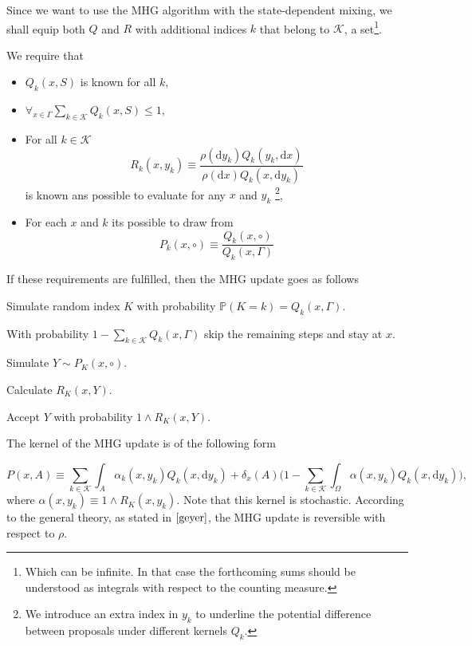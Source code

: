 Since we want to use the MHG algorithm with the state-dependent mixing, we shall equip both $Q$ and $R$ with additional indices $k$ that belong to $\mathcal{K}$, a set\footnote{Which can be infinite. In that case the forthcoming sums should be understood as integrals with respect to the counting measure.}.  

We require that

\begin{itemize}
	\item $Q_k (x,S)$ is known for all $k$,
	\item $\forall_{x \in \Gamma} \underset{ k \in \mathcal{K}}{\sum} Q_k (x,S) \leq 1$,
	\item For all $k \in \mathcal{K}$ $$R_k (x,y_k) \equiv \frac{\rho(\mathrm{d } y_k)Q_k (y_k, \mathrm{d }x)}{\rho(\mathrm{d } x)Q_k (x, \mathrm{d }y_k)}$$ is known ans possible to evaluate for any $x$ and $y_k$ \footnote{We introduce an extra index in $y_k$ to underline the potential difference between proposals under different kernels $Q_k$.},
	\item For each $x$ and $k$ its possible to draw from $$P_k(x, \circ) \equiv \frac{Q_k (x, \circ)}{Q_k (x, \Gamma)}$$
\end{itemize}

If these requirements are fulfilled, then the MHG update goes as follows

\begin{algorithm}
	\item Simulate random index $K$ with probability $\mathbb{P}( K = k ) = Q_k (x,\Gamma)$.
	\item[] With probability $1-\underset{k \in \mathcal{K}}{\sum} Q_k (x,\Gamma)$ skip the remaining steps and stay at $x$.
	\item Simulate $Y \sim P_K (x, \circ)$.
	\item Calculate $R_K (x,Y)$.
	\item Accept $Y$ with probability $1\wedge R_K (x,Y)$.
\end{algorithm}

	The kernel of the MHG update is of the following form
	
	$$P(x,A) \equiv \underset{k \in \mathcal{K}}{\sum} \int_A \alpha_k (x,y_k) Q_k(x, \mathrm{d }y_k) + \delta_x (A) \Big(1 - \underset{k \in \mathcal{K}}{\sum} \int_{\Omega} \alpha(x,y_k) Q_k(x,\mathrm{d }y_k) \Big), $$
	where $\alpha(x,y_k) \equiv 1\wedge R_K (x,y_k)$. Note that this kernel is stochastic. According to the general theory, as stated in $\cite{geyer}$, the MHG update is reversible with respect to $\rho$. 
